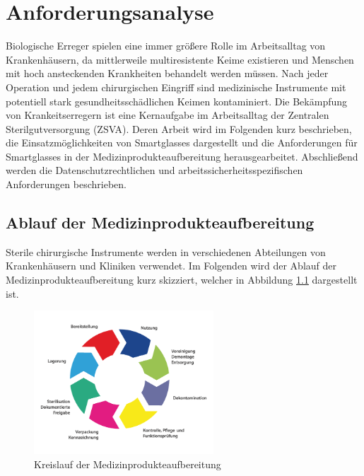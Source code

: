 %
%
%
%
%
%
\chapter{Anforderungsanalyse}
\label{ch:Anforderungsanalyse}
Biologische Erreger spielen eine immer größere Rolle im Arbeitsalltag von Krankenhäusern, da mittlerweile multiresistente Keime existieren \cite{Niknam2017} und Menschen mit hoch ansteckenden Krankheiten behandelt werden müssen. Nach jeder Operation und jedem chirurgischen Eingriff sind medizinische Instrumente mit potentiell stark gesundheitsschädlichen Keimen kontaminiert. Die Bekämpfung von Krankeitserregern ist eine Kernaufgabe im Arbeitsalltag der Zentralen Sterilgutversorgung (ZSVA). Deren Arbeit wird im Folgenden kurz beschrieben, die Einsatzmöglichkeiten von Smartglasses dargestellt und die Anforderungen für Smartglasses in der Medizinprodukteaufbereitung herausgearbeitet. Abschließend werden die Datenschutzrechtlichen und arbeitssicherheitsspezifischen Anforderungen beschrieben.
%
%
%
%
%
%
\section{Ablauf der Medizinprodukteaufbereitung}
\label{sec:Ablauf_der_Medizinprodukteaufbereitung}
Sterile chirurgische Instrumente werden in verschiedenen Abteilungen von Krankenhäusern und Kliniken verwendet. Im Folgenden wird der Ablauf der Medizinprodukteaufbereitung kurz skizziert, welcher in Abbildung \ref{fig:Ablauf_der_Medizinprodukteaufbereitung} dargestellt ist.
%
\begin{figure}[htbp]
    \centering
    \includegraphics[width=0.6\textwidth]{data/bilder/kreislauf-ZSVA.png}
    \caption{Kreislauf der Medizinprodukteaufbereitung \cite{AKI-ArbeitskreisInstrumenten-Aufbereitung2012}}
    \label{fig:Ablauf_der_Medizinprodukteaufbereitung}
\end{figure}

